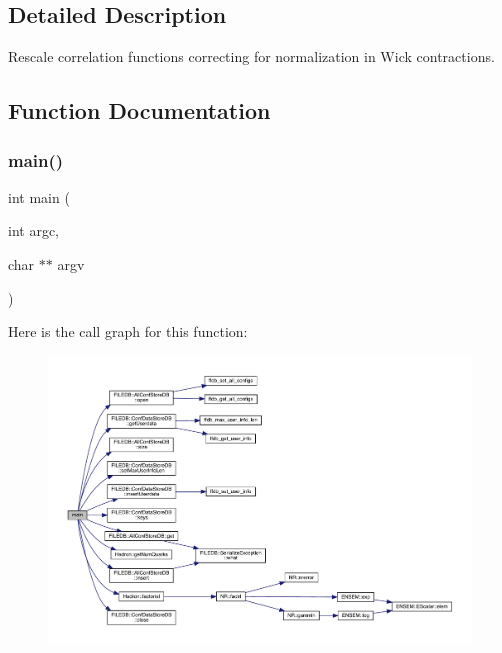 \subsection{Detailed Description}
Rescale correlation functions correcting for normalization in Wick contractions. 



\subsection{Function Documentation}
\mbox{\label{adat-devel_2main_2dbutil_2dbwick__rescale_8cc_a3c04138a5bfe5d72780bb7e82a18e627}} 
\subsubsection{\texorpdfstring{main()}{main()}}
{\footnotesize\ttfamily int main (\begin{DoxyParamCaption}\item[{int}]{argc,  }\item[{char $\ast$$\ast$}]{argv }\end{DoxyParamCaption})}

Here is the call graph for this function\+:
\nopagebreak
\begin{figure}[H]
\begin{center}
\leavevmode
\includegraphics[width=350pt]{d9/da5/adat-devel_2main_2dbutil_2dbwick__rescale_8cc_a3c04138a5bfe5d72780bb7e82a18e627_cgraph}
\end{center}
\end{figure}
